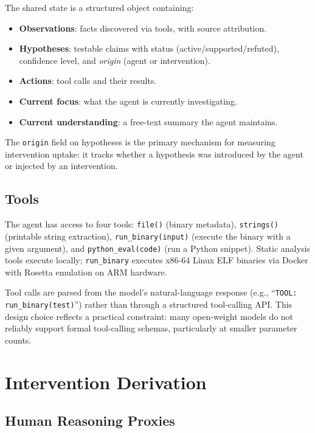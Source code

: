 \documentclass[letterpaper]{article}
\begin{document}
The shared state is a structured object containing:

\begin{itemize}
    \item \textbf{Observations}: facts discovered via tools, with source attribution.
    \item \textbf{Hypotheses}: testable claims with status (active/supported/refuted), confidence level, and \emph{origin} (agent or intervention).
    \item \textbf{Actions}: tool calls and their results.
    \item \textbf{Current focus}: what the agent is currently investigating.
    \item \textbf{Current understanding}: a free-text summary the agent maintains.
\end{itemize}

The \texttt{origin} field on hypotheses is the primary mechanism for measuring intervention uptake: it tracks whether a hypothesis was introduced by the agent or injected by an intervention.

\subsection{Tools}

The agent has access to four tools: \texttt{file()} (binary metadata), \texttt{strings()} (printable string extraction), \texttt{run\_binary(input)} (execute the binary with a given argument), and \texttt{python\_eval(code)} (run a Python snippet).
Static analysis tools execute locally; \texttt{run\_binary} executes x86-64 Linux ELF binaries via Docker with Rosetta emulation on ARM hardware.

Tool calls are parsed from the model's natural-language response (e.g., ``\texttt{TOOL: run\_binary(test)}'') rather than through a structured tool-calling API.
This design choice reflects a practical constraint: many open-weight models do not reliably support formal tool-calling schemas, particularly at smaller parameter counts.

\section{Intervention Derivation}

\subsection{Human Reasoning Proxies}
\end{document}
